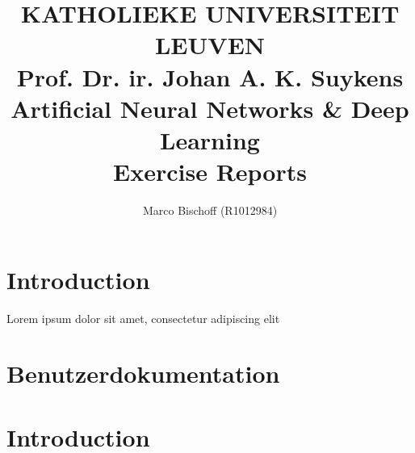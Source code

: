 \documentclass{article}
\title{
  \vspace*{2cm}
  {\bf \scriptsize
    KATHOLIEKE UNIVERSITEIT LEUVEN \\\vspace{0.3cm}
    Prof. Dr. ir. Johan A. K. Suykens
  } \vspace{2cm} \\
  Artificial Neural Networks \& Deep Learning \\
  {\large Exercise Reports}
}
\author{Marco Bischoff (R1012984)}
\begin{document}
\pagestyle{headings}

\maketitle
\newpage

\tableofcontents
\newpage



\section{Introduction}
\label{ch:1}

Lorem ipsum dolor sit amet, consectetur adipiscing elit
\cite{Ries1522Rad}



\newpage
\nocite{}





\appendix

\section{Benutzerdokumentation}
\label{app1}
\section{Introduction}
\end{document}
